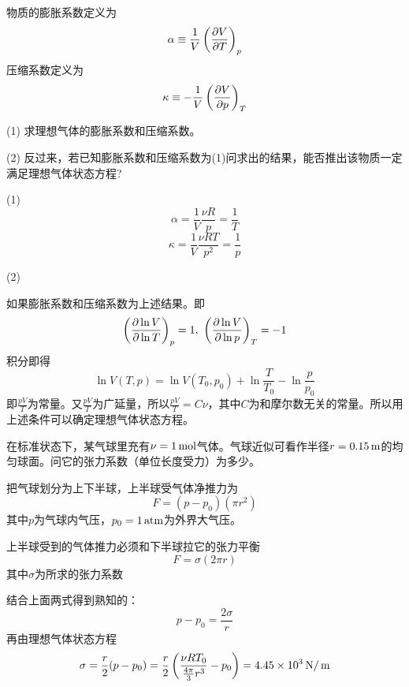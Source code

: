 \documentclass[CJK]{beamer}
\begin{document}
\begin{frame}
  \chtitle{\proid (\stwo)}
  \bch
  物质的膨胀系数定义为
  $$\alpha \equiv \frac{1}{V}\left(\frac{\partial V}{\partial T}\right)_{p} $$
  压缩系数定义为
  $$\kappa \equiv -\frac{1}{V}\left(\frac{\partial V}{\partial p}\right)_{T} $$
  \bitem
\item[(1)]{求理想气体的膨胀系数和压缩系数。}
\item[(2)]{反过来，若已知膨胀系数和压缩系数为(1)问求出的结果，能否推出该物质一定满足理想气体状态方程?}
  \eitem
  \ech
\end{frame}

\begin{frame}
  \bch
  {\small
  \bitem
\item[(1)]{$$\alpha = \frac{1}{V}\frac{\nu R}{p} = \frac{1}{T}$$
  $$\kappa = \frac{1}{V}\frac{\nu RT}{p^2} = \frac{1}{p}$$
}
\item[(2)]{如果膨胀系数和压缩系数为上述结果。即
  $$\left(\frac{\partial \ln V}{\partial \ln T}\right)_{p} = 1,\ \left(\frac{\partial \ln V}{\partial \ln p}\right)_{T} = -1$$
  积分即得
  $$ \ln V(T, p)  = \ln V(T_0, p_0) + \ln\frac{T}{T_0} - \ln\frac{p}{p_0} $$
  即$\frac{pV}{T}$为常量。又$\frac{pV}{T}$为广延量，所以$\frac{pV}{T} = C\nu$，其中$C$为和摩尔数无关的常量。所以用上述条件可以确定理想气体状态方程。
  
}  
  \eitem
  }
  \ech
\end{frame}

\begin{frame}
  \chtitle{\proid (\stwo)}
  \bch
  在标准状态下，某气球里充有$\nu=1\,\mathrm{mol}$气体。气球近似可看作半径$r=0.15\,\mathrm{m}$的均匀球面。问它的张力系数（单位长度受力）为多少。

  
  \ech
\end{frame}

\begin{frame}
  \bch
  {\small
  把气球划分为上下半球，上半球受气体净推力为
  $$F=(p -p_0)(\pi r^2)$$
  其中$p$为气球内气压，$p_0=1\,\mathrm{atm}$为外界大气压。

  上半球受到的气体推力必须和下半球拉它的张力平衡
  $$ F = \sigma (2\pi r)$$
  其中$\sigma$为所求的张力系数

  结合上面两式得到熟知的：
  $$ p-p_0 = \frac{2\sigma}{r} $$
  再由理想气体状态方程
  $$\sigma = \frac{r}{2}(p-p_0) = \frac{r}{2}\left(\frac{\nu R T_0}{\frac{4\pi}{3}r^3} - p_0\right) = 4.45\times 10^3 \,\mathrm{N}/\,\mathrm{m} $$

  }
  \ech
\end{frame}
\end{document}
